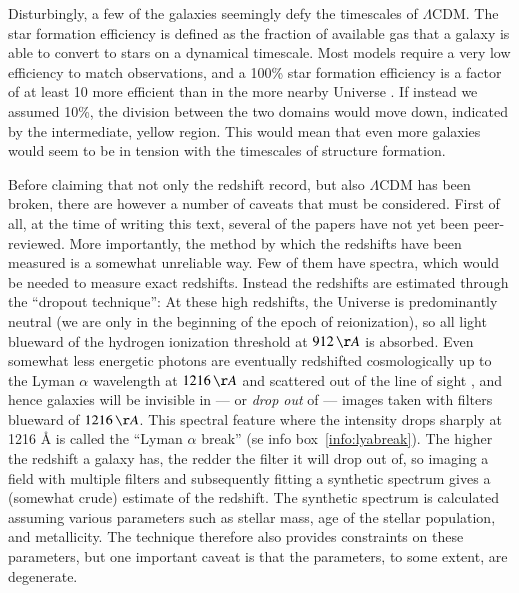 \documentclass[useAMS]{aa}
\begin{document}
Disturbingly, a few of the galaxies seemingly defy the timescales of $\Lambda$CDM.
The star formation efficiency is defined as the fraction of available gas that a galaxy is able to convert to stars on a dynamical timescale.
Most models require a very low efficiency to match observations, and a 100\% star formation efficiency is a factor of at least 10 more efficient than in the more nearby Universe \citep[see e.g.][]{Behroozi2013,Tacchella2018}.
If instead we assumed 10\%, the division between the two domains would move down, indicated by the intermediate, yellow region.
This would mean that even more galaxies would seem to be in tension with the timescales of structure formation.

Before claiming that not only the redshift record, but also $\Lambda$CDM has been broken, there are however a number of caveats that must be considered.
First of all, at the time of writing this text, several of the papers have not yet been peer-reviewed.
More importantly, the method by which the redshifts have been measured is a somewhat unreliable way.
Few of them have spectra, which would be needed to measure exact redshifts.
Instead the redshifts are estimated through the ``dropout technique'': At these high redshifts, the Universe is predominantly neutral (we are only in the beginning of the epoch of reionization), so all light blueward of the hydrogen ionization threshold at $912\,{\AA}$ is absorbed.
Even somewhat less energetic photons are eventually redshifted cosmologically up to the Lyman $\alpha$ wavelength at $1216\,{\AA}$ and scattered out of the line of sight \citep{Laursen2011}, and hence galaxies will be invisible in --- or \emph{drop out} of --- images taken with filters blueward of $1216\,{\AA}$.
This spectral feature where the intensity drops sharply at 1216 {\AA} is called the ``Lyman $\alpha$ break'' (se info box~\ref{info:lyabreak}).
The higher the redshift a galaxy has, the redder the filter it will drop out of, so imaging a field with multiple filters and subsequently fitting a synthetic spectrum gives a (somewhat crude) estimate of the redshift.
The synthetic spectrum is calculated assuming various parameters such as stellar mass, age of the stellar population, and metallicity.
The technique therefore also provides constraints on these parameters, but one important caveat is that the parameters, to some extent, are degenerate.
\end{document}
